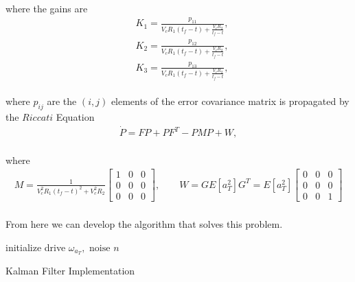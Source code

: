 \paragraph{}
where the gains are
\begin{align*}
&K_1 = \frac{p_{11}}{V_cR_1(t_f-t)+\frac{V_cR_2}{t_f-t}},\\
&K_2 = \frac{p_{12}}{V_cR_1(t_f-t)+\frac{V_cR_2}{t_f-t}},\\
&K_3 = \frac{p_{13}}{V_cR_1(t_f-t)+\frac{V_cR_2}{t_f-t}},
\end{align*}
\paragraph{}
where $p_{ij}$ are the $(i,j)$ elements of the error covariance matrix is propagated by the $Riccati$ Equation
\begin{align}
\dot{P} = FP + PF^T - PMP + W,
\end{align}
\paragraph{}
where
\begin{align*}
	M = \frac{1}{V_c^2R_1(t_f-t)^2 +V_c^2R_2}\begin{bmatrix}
	1&0&0\\0&0&0\\0&0&0
	\end{bmatrix}, \qquad W = GE[a_T^2]G^T = E[a_T^2]\begin{bmatrix}
	0&0&0\\0&0&0\\0&0&1
	\end{bmatrix}
\end{align*}
\paragraph{}
From here we can develop the algorithm that solves this problem.\\

\begin{algorithm}[H]
	\SetAlgoLined
	initialize drive $\omega_{a_T},\text{ noise } n$\;
	\caption{Kalman Filter Implementation}
\end{algorithm}